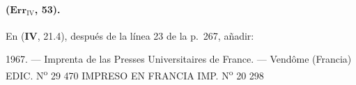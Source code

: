 \paragraph{($\mathbf{Err}_{\mathrm{IV}}$, 53).}
En (\textbf{IV}, 21.4), después de la línea 23 de la p.~267, añadir:

\begingroup
\def\EGAIVSuppressErratumLabels{1}

\endgroup

\bigskip
\begin{center}
\small
1967. --- Imprenta de las Presses Universitaires de France. --- Vendôme
(Francia)\\
EDIC. N\textsuperscript{o} 29 470\qquad
IMPRESO EN FRANCIA\qquad
IMP. N\textsuperscript{o} 20 298
\end{center}
